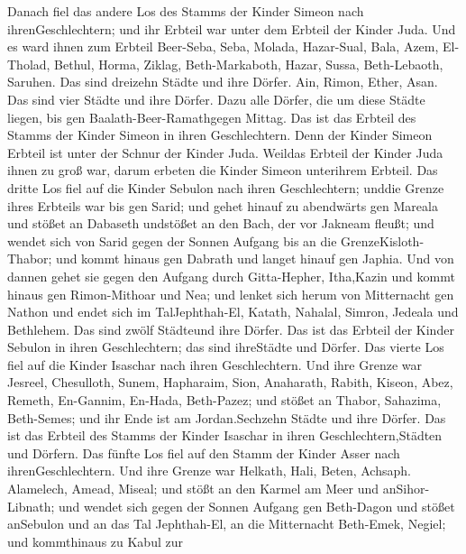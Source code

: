  Danach fiel das andere Los des Stamms der Kinder Simeon
nach ihrenGeschlechtern; und ihr Erbteil war unter dem Erbteil der
Kinder Juda.  Und es ward ihnen zum Erbteil Beer-Seba, Seba,
Molada,  Hazar-Sual, Bala, Azem,  El-Tholad,
Bethul, Horma,  Ziklag, Beth-Markaboth, Hazar, Sussa,
 Beth-Lebaoth, Saruhen. Das sind dreizehn Städte und ihre
Dörfer.  Ain, Rimon, Ether, Asan. Das sind vier Städte und
ihre Dörfer.  Dazu alle Dörfer, die um diese Städte liegen,
bis gen Baalath-Beer-Ramathgegen Mittag. Das ist das Erbteil des Stamms
der Kinder Simeon in ihren Geschlechtern.  Denn der Kinder
Simeon Erbteil ist unter der Schnur der Kinder Juda. Weildas Erbteil der
Kinder Juda ihnen zu groß war, darum erbeten die Kinder Simeon
unterihrem Erbteil.  Das dritte Los fiel auf die Kinder
Sebulon nach ihren Geschlechtern; unddie Grenze ihres Erbteils war bis
gen Sarid;  und gehet hinauf zu abendwärts gen Mareala und
stößet an Dabaseth undstößet an den Bach, der vor Jakneam fleußt;
 und wendet sich von Sarid gegen der Sonnen Aufgang bis an
die GrenzeKisloth-Thabor; und kommt hinaus gen Dabrath und langet hinauf
gen Japhia.  Und von dannen gehet sie gegen den Aufgang
durch Gitta-Hepher, Itha,Kazin und kommt hinaus gen Rimon-Mithoar und
Nea;  und lenket sich herum von Mitternacht gen Nathon und
endet sich im TalJephthah-El,  Katath, Nahalal, Simron,
Jedeala und Bethlehem. Das sind zwölf Städteund ihre Dörfer.
 Das ist das Erbteil der Kinder Sebulon in ihren
Geschlechtern; das sind ihreStädte und Dörfer.  Das vierte
Los fiel auf die Kinder Isaschar nach ihren Geschlechtern. 
Und ihre Grenze war Jesreel, Chesulloth, Sunem,  Hapharaim,
Sion, Anaharath,  Rabith, Kiseon, Abez, 
Remeth, En-Gannim, En-Hada, Beth-Pazez;  und stößet an
Thabor, Sahazima, Beth-Semes; und ihr Ende ist am Jordan.Sechzehn Städte
und ihre Dörfer.  Das ist das Erbteil des Stamms der Kinder
Isaschar in ihren Geschlechtern,Städten und Dörfern.  Das
fünfte Los fiel auf den Stamm der Kinder Asser nach ihrenGeschlechtern.
 Und ihre Grenze war Helkath, Hali, Beten, Achsaph.
 Alamelech, Amead, Miseal; und stößt an den Karmel am Meer
und anSihor-Libnath;  und wendet sich gegen der Sonnen
Aufgang gen Beth-Dagon und stößet anSebulon und an das Tal Jephthah-El,
an die Mitternacht Beth-Emek, Negiel; und kommthinaus zu Kabul zur
